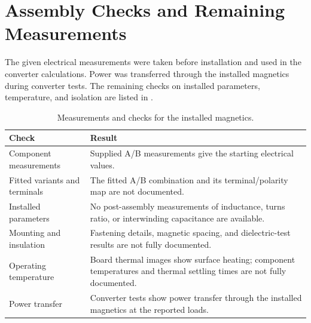 \section{Assembly Checks and Remaining Measurements}
\label{sec:mag-verification}

The given electrical measurements were taken before installation and used in the converter calculations. Power was transferred through the installed magnetics during converter tests. The remaining checks on installed parameters, temperature, and isolation are listed in .

\begin{table}[H]
\centering
\caption{Measurements and checks for the installed magnetics.}
\label{tab:mag-verification-actions}
\label{tab:mag-mounting-record}
\label{tab:mag-pin-net-template}
\label{tab:mag-mechanical-record}
\label{tab:mag-isolation-record}
\label{tab:mag-thermal-record}
\begin{tabularx}{\textwidth}{@{}p{}X@{}}
\toprule
Check & Result\\
\midrule
Component measurements & Supplied A/B measurements give the starting electrical values.\\
Fitted variants and terminals & The fitted A/B combination and its terminal/polarity map are not documented.\\
Installed parameters & No post-assembly measurements of inductance, turns ratio, or interwinding capacitance are available.\\
Mounting and insulation & Fastening details, magnetic spacing, and dielectric-test results are not fully documented.\\
Operating temperature & Board thermal images show surface heating; component temperatures and thermal settling times are not fully documented.\\
Power transfer & Converter tests show power transfer through the installed magnetics at the reported loads.\\
\bottomrule
\end{tabularx}
\end{table}
